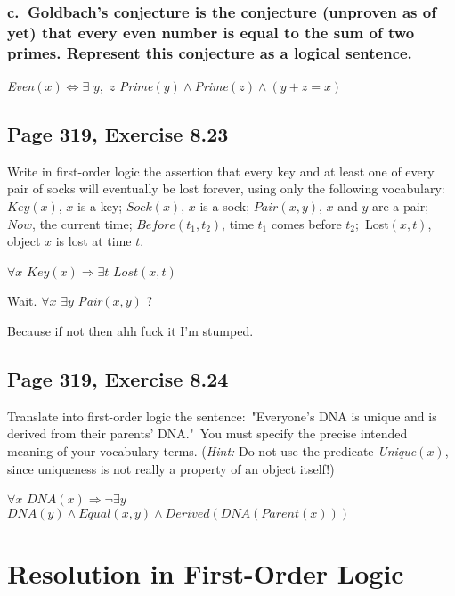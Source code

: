 \documentclass{article}
\begin{document}
\subsubsection{c.\ Goldbach's conjecture is the conjecture (unproven as of
yet) that every even number is equal to the sum of two primes. Represent
this conjecture as a logical sentence.}

\textit{Even}$\left( x\right) \Leftrightarrow \exists $ $y,$ $z$ \textit{%
Prime}$\left( y\right) \wedge $\textit{Prime}$\left( z\right) \wedge \left(
y+z=x\right) $

\subsection{Page 319, Exercise 8.23}

Write in first-order logic the assertion that every key and at least one of
every pair of socks will eventually be lost forever, using only the
following vocabulary: $Key\left( x\right) $, $x$ is a key; $Sock\left(
x\right) $, $x$ is a sock; $Pair\left( x,y\right) $, $x$ and $y$ are a pair; 
$Now$, the current time; $Before\left( t_{1},t_{2}\right) $, time $t_{1}$
comes before $t_{2};$ Lost$\left( x,t\right) $, object $x$ is lost at time $%
t $.

$\forall x$ $Key\left( x\right) \Rightarrow \exists t$ $Lost\left(
x,t\right) $

Wait. $\forall x$ $\exists y$ \textit{Pair}$\left( x,y\right) $ ?

Because if not then ahh fuck it I'm stumped.

\subsection{Page 319, Exercise 8.24}

Translate into first-order logic the sentence:\ "Everyone's DNA is unique
and is derived from their parents' DNA."\ You must specify the precise
intended meaning of your vocabulary terms. (\textit{Hint:} Do not use the
predicate \textit{Unique}$\left( x\right) $, since uniqueness is not really
a property of an object itself!)

$\forall x$ $DNA\left( x\right) \Longrightarrow \lnot \exists y$ $DNA\left(
y\right) \wedge Equal\left( x,y\right) \wedge Derived\left( DNA\left(
Parent\left( x\right) \right) \right) $

\section{Resolution in First-Order Logic}
\end{document}
